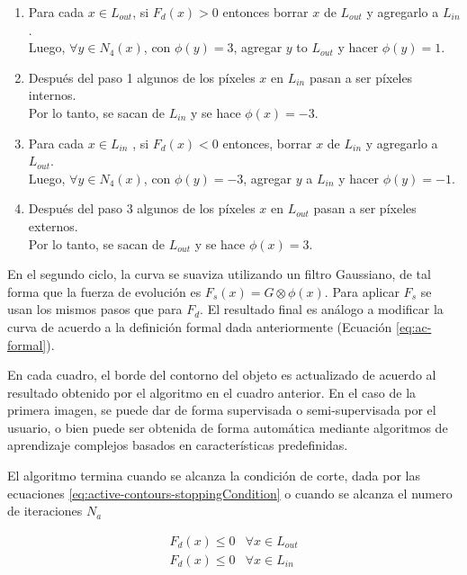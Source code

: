 \begin{enumerate}

    \item Para cada $x \in L_{out}$, si $F_{d}(x) > 0$ entonces borrar $x$ de $L_{out}$ y agregarlo a $L_{in}$. \\
    Luego, $\forall y \in N_{4}(x)$, con $\phi(y) = 3$, agregar $y$ to $L_{out}$ y hacer $\phi(y) = 1$.

    \item Después del paso 1 algunos de los píxeles $x$ en $L_{in}$ pasan a ser píxeles internos. \\
    Por lo tanto, se sacan de $L_{in}$ y se hace $\phi(x) = -3$.

    \item Para cada $x \in L_{in}$ , si $F_{d}(x) < 0$ entonces, borrar $x$ de $L_{in}$ y agregarlo a $L_{out}$. \\
    Luego, $\forall y \in N_{4}(x)$, con $\phi(y) = -3$, agregar $y$ a $L_{in}$ y hacer $\phi(y) = -1$.


    \item Después del paso 3 algunos de los píxeles $x$ en $L_{out}$ pasan a ser píxeles externos. \\
    Por lo tanto, se sacan de $L_{out}$ y se hace $\phi(x) = 3$.

\end{enumerate}

En el segundo ciclo, la curva se suaviza utilizando un filtro Gaussiano, de tal
forma que la fuerza de evolución es $F_{s}(x) = G \otimes \phi(x)$. Para aplicar $F_s$ se usan los mismos
pasos que para $F_d$. El resultado final es análogo a modificar la curva de acuerdo
a la definición formal dada anteriormente (Ecuación \ref{eq:ac-formal}).

En cada cuadro, el borde del contorno del objeto es actualizado de acuerdo al
resultado obtenido por el algoritmo en el cuadro anterior. En el caso de la
primera imagen, se puede dar de forma supervisada o semi-supervisada por el
usuario, o bien puede ser obtenida de forma automática mediante algoritmos de
aprendizaje complejos basados en características predefinidas.

El algoritmo termina cuando se alcanza la condición de corte, dada por las
ecuaciones \ref{eq:active-contours-stoppingCondition} o cuando se alcanza el numero de iteraciones $N_a$

\begin{equation}
\label{eq:active-contours-stoppingCondition}
    \begin{array}{ll}
        F_{d}(x) \leq 0 & \forall x \in L_{out}\\
        F_{d}(x) \leq 0 & \forall x \in L_{in}
    \end{array}
\end{equation}

